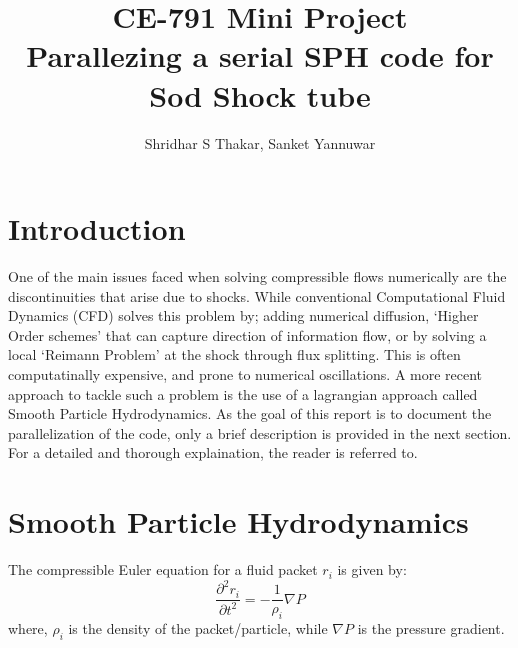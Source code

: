 \documentclass[11pt]{article}
\title{\textbf{CE-791 Mini Project} \\ Parallezing a serial SPH code for Sod Shock tube}
\author{Shridhar S Thakar, Sanket Yannuwar}
\begin{document}
\maketitle 
\section{Introduction}
One of the main issues faced when solving compressible flows numerically are the discontinuities that arise due to shocks. 
While conventional Computational Fluid Dynamics (CFD) solves this problem by; adding numerical diffusion, `Higher Order schemes' that can capture direction of information flow, or by solving a local `Reimann Problem' at the shock through flux splitting. 
This is often computatinally expensive, and prone to numerical oscillations.
A more recent approach to tackle such a problem is the use of a lagrangian approach called Smooth Particle Hydrodynamics. As the goal of this report is to document the parallelization of the code,  only a brief description is provided in the next section. 
For a detailed and thorough explaination, the reader is referred to.
\section{Smooth Particle Hydrodynamics}
The compressible Euler equation for a fluid packet $r_i$ is given by:
\begin{equation}
  \frac{\partial ^2 r_i}{\partial t ^2} = -\displaystyle\frac{1}{\rho_i}\nabla P
  \label{eq:governing equation}
\end{equation}
where, $\rho_i$ is the density of the packet/particle, while $\nabla P$ is the pressure gradient. 
\end{document}
